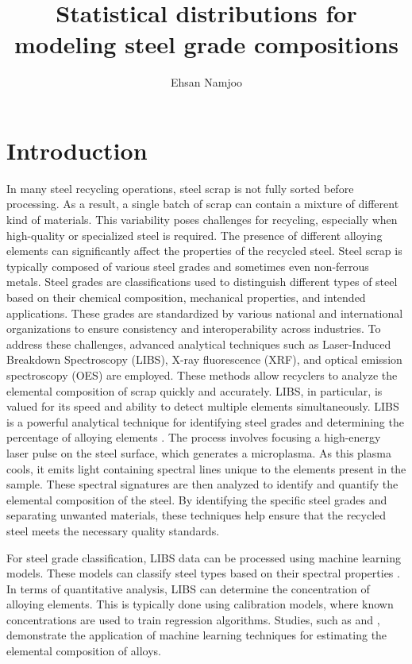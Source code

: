 \documentclass[12pt,a4paper]{article}
\title{Statistical distributions for modeling steel grade compositions  }
\author{Ehsan Namjoo}   %
\begin{document}
	
	\maketitle
	\tableofcontents
	\newpage
	
	
	\section{Introduction} \label{h:intro}
	In many steel recycling operations, steel scrap is not fully sorted before processing. As a result, a single batch of scrap can contain a mixture of different kind of materials. This variability poses challenges for recycling, especially when high-quality or specialized steel is required. The presence of different alloying elements can significantly affect the properties of the recycled steel. Steel scrap is typically composed of various steel grades and sometimes even non-ferrous metals. Steel grades are classifications used to distinguish different types of steel based on their chemical composition, mechanical properties, and intended applications. These grades are standardized by various national and international organizations to ensure consistency and interoperability across industries.
	To address these challenges, advanced analytical techniques such as Laser-Induced Breakdown Spectroscopy (LIBS), X-ray fluorescence (XRF), and optical emission spectroscopy (OES) are employed. These methods allow recyclers to analyze the elemental composition of scrap quickly and accurately. LIBS, in particular, is valued for its speed and ability to detect multiple elements simultaneously. 
	LIBS is a powerful analytical technique for identifying steel grades and determining the percentage of alloying elements \cite{Legnaioli_LIBS_Metals_2014}. The process involves focusing a high-energy laser pulse on the steel surface, which generates a microplasma. As this plasma cools, it emits light containing spectral lines unique to the elements present in the sample. These spectral signatures are then analyzed to identify and quantify the elemental composition of the steel.
	By identifying the specific steel grades and separating unwanted materials, these techniques help ensure that the recycled steel meets the necessary quality standards. 

 
 
	For steel grade classification, LIBS data can be processed using machine learning models. These models can classify steel types based on their spectral properties \cite{Lin2024}. 	In terms of quantitative analysis, LIBS can determine the concentration of alloying elements. This is typically done using calibration models, where known concentrations are used to train regression algorithms. Studies, such as  \cite{Traparic2023} and  \cite{Jiang2020}, demonstrate the application of machine learning techniques for estimating the elemental composition of alloys.
	
\end{document}
